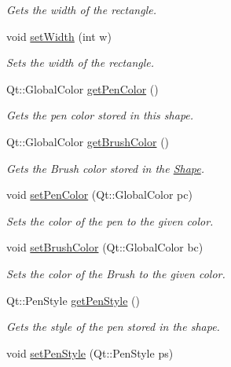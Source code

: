 \begin{DoxyCompactItemize}
\begin{DoxyCompactList}\small\item\em Gets the width of the rectangle. \end{DoxyCompactList}\item 
void \hyperlink{classRectangle_a4b2a528eff1c42b1a46148b2f5562c7b}{set\+Width} (int w)
\begin{DoxyCompactList}\small\item\em Sets the width of the rectangle. \end{DoxyCompactList}\item 
Qt\+::\+Global\+Color \hyperlink{classRectangle_a260ef02e14a452e25b1ebddc805928c8}{get\+Pen\+Color} ()
\begin{DoxyCompactList}\small\item\em Gets the pen color stored in this shape. \end{DoxyCompactList}\item 
Qt\+::\+Global\+Color \hyperlink{classRectangle_af105857f6e7bda45c45d0ce1309a032e}{get\+Brush\+Color} ()
\begin{DoxyCompactList}\small\item\em Gets the Brush color stored in the \hyperlink{classShape}{Shape}. \end{DoxyCompactList}\item 
void \hyperlink{classRectangle_a489b9d60a05a4d2f6ee01d7989b30c22}{set\+Pen\+Color} (Qt\+::\+Global\+Color pc)
\begin{DoxyCompactList}\small\item\em Sets the color of the pen to the given color. \end{DoxyCompactList}\item 
void \hyperlink{classRectangle_a645117a96beb4782f2ffc00d0ab865e1}{set\+Brush\+Color} (Qt\+::\+Global\+Color bc)
\begin{DoxyCompactList}\small\item\em Sets the color of the Brush to the given color. \end{DoxyCompactList}\item 
Qt\+::\+Pen\+Style \hyperlink{classRectangle_abb61dc270e5b2b4ae3323e097e6fb7ce}{get\+Pen\+Style} ()
\begin{DoxyCompactList}\small\item\em Gets the style of the pen stored in the shape. \end{DoxyCompactList}\item 
void \hyperlink{classRectangle_a598da91b42f1f3541f687d6c35c23d23}{set\+Pen\+Style} (Qt\+::\+Pen\+Style ps)

\end{DoxyCompactItemize}
